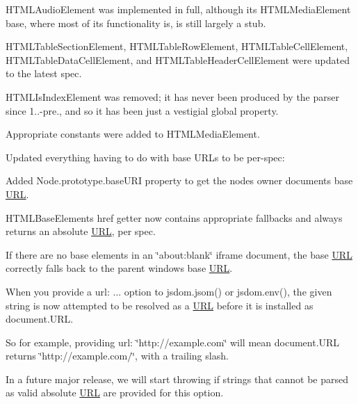 \begin{DoxyItemize}
\begin{DoxyItemize}
\item {\ttfamily H\+T\+M\+L\+Audio\+Element} was implemented in full, although its {\ttfamily H\+T\+M\+L\+Media\+Element} base, where most of its functionality is, is still largely a stub.
\item {\ttfamily H\+T\+M\+L\+Table\+Section\+Element}, {\ttfamily H\+T\+M\+L\+Table\+Row\+Element}, {\ttfamily H\+T\+M\+L\+Table\+Cell\+Element}, {\ttfamily H\+T\+M\+L\+Table\+Data\+Cell\+Element}, and {\ttfamily H\+T\+M\+L\+Table\+Header\+Cell\+Element} were updated to the latest spec.
\item {\ttfamily H\+T\+M\+L\+Is\+Index\+Element} was removed; it has never been produced by the parser since 1..-\/pre., and so it has been just a vestigial global property.
\item Appropriate constants were added to {\ttfamily H\+T\+M\+L\+Media\+Element}.
\end{DoxyItemize}
\item Updated everything having to do with base U\+R\+Ls to be per-\/spec\+:
\begin{DoxyItemize}
\item Added {\ttfamily Node.\+prototype.\+base\+U\+RI} property to get the node\textquotesingle{}s owner document\textquotesingle{}s base \mbox{\hyperlink{namespace_u_r_l}{U\+RL}}.
\item {\ttfamily H\+T\+M\+L\+Base\+Element}\textquotesingle{}s {\ttfamily href} getter now contains appropriate fallbacks and always returns an absolute \mbox{\hyperlink{namespace_u_r_l}{U\+RL}}, per spec.
\item If there are no {\ttfamily base} elements in an {\ttfamily \char`\"{}about\+:blank\char`\"{}} iframe document, the base \mbox{\hyperlink{namespace_u_r_l}{U\+RL}} correctly falls back to the parent window\textquotesingle{}s base \mbox{\hyperlink{namespace_u_r_l}{U\+RL}}.
\end{DoxyItemize}
\item When you provide a {\ttfamily url\+: ...} option to {\ttfamily jsdom.\+jsom()} or {\ttfamily jsdom.\+env()}, the given string is now attempted to be resolved as a \mbox{\hyperlink{namespace_u_r_l}{U\+RL}} before it is installed as {\ttfamily document.\+U\+RL}.
\begin{DoxyItemize}
\item So for example, providing {\ttfamily url\+: \char`\"{}http\+://example.\+com\char`\"{}} will mean {\ttfamily document.\+U\+RL} returns {\ttfamily \char`\"{}http\+://example.\+com/\char`\"{}}, with a trailing slash.
\item In a future major release, we will start throwing if strings that cannot be parsed as valid absolute \mbox{\hyperlink{namespace_u_r_l}{U\+RL}} are provided for this option.
\end{DoxyItemize}
\end{DoxyItemize}

